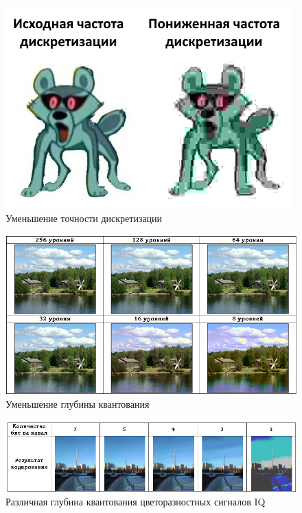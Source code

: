\begin{figure}[H]
	\begin{center}
		\includegraphics[scale=0.9]{../pics/quantization/shakal.png}
		\caption{Уменьшение точности дискретизации} 
		\label{pic:shakal}
	\end{center}
\end{figure}

\begin{figure}[H]
	\begin{center}
		\includegraphics[scale=0.85]{../pics/quantization/levels_of_quantization.png}
		\caption{Уменьшение глубины квантования} 
		\label{pic:levels_of_quantization}
	\end{center}
\end{figure}

\begin{figure}[H]
	\begin{center}
		\includegraphics[scale=0.75]{../pics/quantization/quantization.png}
		\caption{Различная глубина квантования цветоразностных сигналов IQ} 
		\label{pic:quantization}
	\end{center}
\end{figure}

